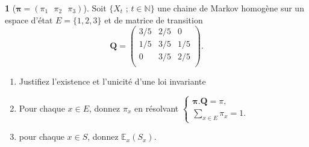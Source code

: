 \documentclass[8pt,notheorems]{beamer}
\theoremstyle{definition}
\theoremstyle{example}
\newtheorem{example}{\translate{Exemple}}
\theoremstyle{mystyle}
\theoremstyle{plain}
\begin{document}
\begin{frame}[allowframebreaks]
\begin{example}[$\mathbf{\pi}=\left(\pi_1\text{ }\pi_2\text{ }\pi_3\right)$]
Soit $\{X_t\text{ ; }t\in\mathbb{N}\}$ une chaine de Markov homogène sur un espace d'état $E=\{1,2,3\}$ et de matrice de transition
\begin{equation*}
\mathbf{Q}=
\left(\begin{array}{ccc}
3/5&2/5&0\\
1/5&3/5&1/5\\
0&3/5&2/5\\
\end{array}\right).
\end{equation*}
\begin{enumerate}
\item Justifiez l'existence et l'unicité d'une loi invariante
\item Pour chaque $x\in E$, donnez $\pi_x$ en résolvant
$
\begin{cases}
\mathbf{\pi}.\mathbf{Q}=\pi,&\\
\sum_{x\in E}\pi_x=1.&
\end{cases}
$
\item pour chaque $x\in S$, donnez $\mathbb{E}_x(S_x)$.
\end{enumerate}
\end{example}
\end{frame}
\end{document}

